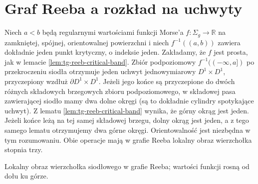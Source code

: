 \section{Graf Reeba a rozkład na uchwyty}
\label{sec:tg-reeb-handles}

\begin{przyklad}
Niech $a<b$ będą regularnymi wartościami funkcji
Morse'a $f:\Sigma_g\to\mathbb R$ na zamkniętej,
spójnej, orientowalnej powierzchni i niech
$f^{-1}((a,b))$ zawiera dokładnie jeden punkt krytyczny,
o indeksie jeden. Zakładamy, że $f$ jest prosta,
jak w lemacie \ref{lem:tg-reeb-critical-band}. Zbiór podpoziomowy $f^{-1}((-\infty,a])$ po przekroczeniu
siodła otrzymuje jeden uchwyt jednowymiarowy
$D^1\times D^1$, przyczepiony wzdłuż
$\partial D^1\times D^1$. Jeżeli jego końce są przyczepione
do dwóch różnych składowych brzegowych zbioru
podpoziomowego, w składowej pasa zawierającej siodło
mamy dwa dolne okręgi (są to dokładnie cylindry
spotykające uchwyt). Z lematu
\ref{lem:tg-reeb-critical-band} wynika, że górny
okrąg jest jeden. Jeżeli końce leżą na tej samej
składowej brzegu, dolny okrąg jest jeden, a z tego
samego lematu otrzymujemy dwa górne okręgi.
Orientowalność jest niezbędna w tym rozumowaniu. Obie operacje mają
w grafie Reeba lokalny obraz wierzchołka stopnia trzy.
\end{przyklad}

\begin{samepage}
\begin{center}
\begin{minipage}{.96\linewidth}\centering
{}\par\smallskip

{\footnotesize Lokalny obraz wierzchołka siodłowego
w grafie Reeba; wartości funkcji rosną od dołu ku górze.}
\end{minipage}
\end{center}
\end{samepage}

